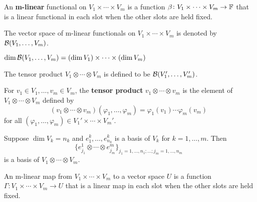 \documentclass{extarticle}
\begin{document}
\begin{definition}
    An \textbf{m-linear} functional on \(V_1 \times \cdots \times V_m\) is a function 
    \(\beta \colon V_1 \times \cdots \times V_m \to \mathbb{F}\) that is a linear functional in 
    each slot when the other slots are held fixed. 

    The vector space of m-linear functionals on \(V_1 \times \cdots \times V_m\) is denoted by 
    \(\mathcal{B}(V_1, \ldots, V_m)\).
\end{definition}

\begin{corollary}
    \(\dim \mathcal{B} (V_1, \ldots, V_m) = (\dim V_1) \times \cdots \times (\dim V_m)\)
\end{corollary}


\begin{definition}
    The tensor product \(V_1 \otimes \cdots \otimes V_m\) is defined to be \(\mathcal{B}(V_1', \ldots, V_m')\). 

    For \(v_1 \in V_1, \ldots, v_m \in V_m\), the \textbf{tensor product} \(v_1 \otimes \cdots \otimes v_m\)
    is the element of \(V_1 \otimes \cdots \otimes V_m\) defined by 
    \[(v_1 \otimes \cdots \otimes v_m) (\varphi_1, \ldots, \varphi_m) = \varphi_1(v_1)\cdots \varphi_m(v_m)\]
    for all \((\varphi_1, \ldots, \varphi_m) \in V_1' \times \cdots \times V_m'\).
\end{definition}

\begin{corollary}
    Suppose \(\dim V_k = n_k\) and \(e_1^k, \ldots, e_{n_k}^k\) is a basis of \(V_k\) for 
    \(k = 1, \ldots, m\). Then 
    \[\{e_{j_1}^1 \otimes \cdots \otimes e_{j_m}^m\}_{j_1 = 1, \ldots, n_1; \ldots; j_m = 1, \ldots, n_m}\]
    is a basis of \(V_1 \otimes \cdots \otimes V_m\).
\end{corollary}

\begin{definition}
    An m-linear map from \(V_1 \times \cdots \times V_m\) to a vector space \(U\) is a function 
    \(\Gamma \colon V_1 \times \cdots \times V_m \to U\) that is a linear map in each slot when the other 
    slots are held fixed. 
\end{definition}
\end{document}

